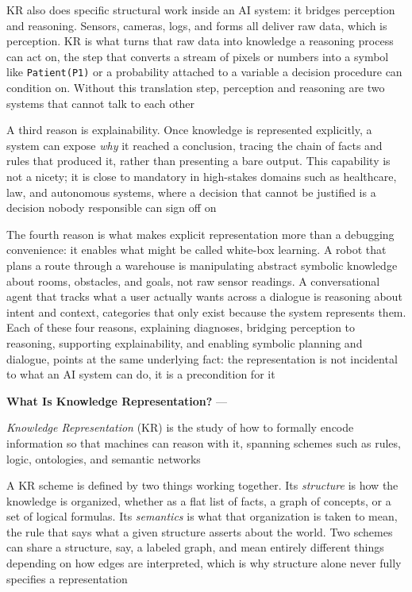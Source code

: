 KR also does specific structural work inside an AI system: it bridges
perception and reasoning. Sensors, cameras, logs, and forms all deliver raw
data, which is perception. KR is what turns that raw data into knowledge a
reasoning process can act on, the step that converts a stream of pixels or
numbers into a symbol like \texttt{Patient(P1)} or a probability attached to
a variable a decision procedure can condition on. Without this translation
step, perception and reasoning are two systems that cannot talk to each
other

A third reason is explainability. Once knowledge is represented explicitly,
a system can expose \emph{why} it reached a conclusion, tracing the chain of
facts and rules that produced it, rather than presenting a bare output. This
capability is not a nicety; it is close to mandatory in high-stakes domains
such as healthcare, law, and autonomous systems, where a decision that
cannot be justified is a decision nobody responsible can sign off on

The fourth reason is what makes explicit representation more than a
debugging convenience: it enables what might be called white-box learning.
A robot that plans a route through a warehouse is manipulating abstract
symbolic knowledge about rooms, obstacles, and goals, not raw sensor
readings. A conversational agent that tracks what a user actually wants
across a dialogue is reasoning about intent and context, categories that
only exist because the system represents them. Each of these four
reasons, explaining diagnoses, bridging perception to reasoning,
supporting explainability, and enabling symbolic planning and dialogue,
points at the same underlying fact: the representation is not incidental to
what an AI system can do, it is a precondition for it

\textbf{What Is Knowledge Representation?} --- \begin{definition}
  \emph{Knowledge Representation} (KR) is the study of how to formally encode
  information so that machines can reason with it, spanning schemes such as
  rules, logic, ontologies, and semantic networks
\end{definition}
A KR scheme is defined by two things working together. Its \emph{structure}
is how the knowledge is organized, whether as a flat list of facts, a graph
of concepts, or a set of logical formulas. Its \emph{semantics} is what that
organization is taken to mean, the rule that says what a given structure
asserts about the world. Two schemes can share a structure, say, a labeled
graph, and mean entirely different things depending on how edges are
interpreted, which is why structure alone never fully specifies a
representation

